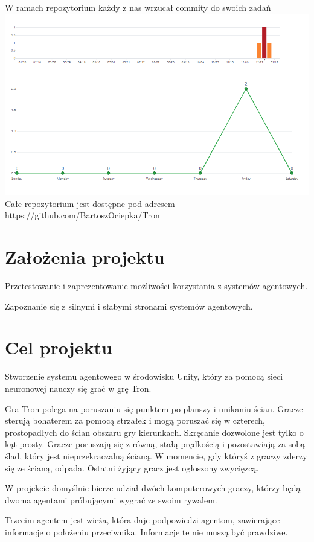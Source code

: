 \documentclass[12pt,a4paper]{article}
\begin{document}
W ramach repozytorium każdy z nas wrzucał commity do swoich zadań \\
\includegraphics[width=0.9\linewidth]{media/githubProof}\\
Całe repozytorium jest dostępne pod adresem \\https://github.com/BartoszOciepka/Tron




\section{Założenia projektu}
Przetestowanie i zaprezentowanie możliwości korzystania z systemów agentowych.

Zapoznanie się z silnymi i słabymi stronami systemów agentowych. 



\section{Cel projektu}
Stworzenie systemu agentowego w środowisku Unity, który za pomocą sieci neuronowej nauczy się grać w grę Tron.

Gra Tron polega na poruszaniu się punktem po planszy i unikaniu ścian. Gracze sterują bohaterem za pomocą strzałek i mogą poruszać się w czterech, prostopadłych do ścian obszaru gry kierunkach. Skręcanie dozwolone jest tylko o kąt prosty. Gracze poruszają się z równą, stałą prędkością i pozostawiają za sobą ślad, który jest nieprzekraczalną ścianą. W momencie, gdy któryś z graczy zderzy się ze ścianą, odpada. Ostatni żyjący gracz jest ogłoszony zwycięzcą.

W projekcie domyślnie bierze udział dwóch komputerowych graczy, którzy będą dwoma agentami próbującymi wygrać ze swoim rywalem.

Trzecim agentem jest wieża, która daje podpowiedzi agentom, zawierające informacje o położeniu przeciwnika. Informacje te nie muszą być prawdziwe.
\end{document}

